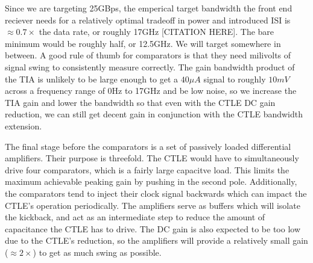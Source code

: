 Since we are targeting 25GBps, the emperical target bandwidth the front end reciever needs for a relatively optimal tradeoff in power and introduced ISI is $\approx 0.7\times$ the data rate, or roughly 17GHz [CITATION HERE]. The bare minimum would be roughly half, or 12.5GHz. We will target somewhere in between. A good rule of thumb for comparators is that they need milivolts of signal swing to consistently measure correctly. The gain bandwidth product of the TIA is unlikely to be large enough to get a $40\mu A$ signal to roughly $10mV$ across a frequency range of 0Hz to 17GHz and be low noise, so we increase the TIA gain and lower the bandwidth so that even with the CTLE DC gain reduction, we can still get decent gain in conjunction with the CTLE bandwidth extension. 

The final stage before the comparators is a set of passively loaded differential amplifiers. Their purpose is threefold. The CTLE would have to simultaneously drive four comparators, which is a fairly large capacitve load. This limits the maximum achievable peaking gain by pushing in the second pole. Additionally, the comparators tend to inject their clock signal backwards which can impact the CTLE's operation periodically. The amplifiers serve as buffers which will isolate the kickback, and act as an intermediate step to reduce the amount of capacitance the CTLE has to drive. The DC gain is also expected to be too low due to the CTLE's reduction, so the amplifiers will provide a relatively small gain ($\approx 2\times$) to get as much swing as possible.



